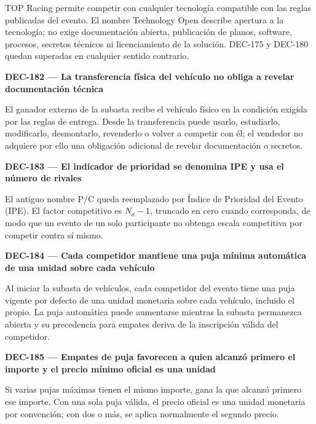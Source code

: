 \documentclass[10pt,letterpaper]{article}
\begin{document}
TOP Racing permite competir con cualquier tecnología compatible con las reglas publicadas del evento. El nombre Technology Open describe apertura a la tecnología; no exige documentación abierta, publicación de planos, software, procesos, secretos técnicos ni licenciamiento de la solución. DEC-175 y DEC-180 quedan superadas en cualquier sentido contrario.\par\vspace{0.45em}
\noindent\textbf{DEC-182 --- La transferencia física del vehículo no obliga a revelar documentación técnica}\par
El ganador externo de la subasta recibe el vehículo físico en la condición exigida por las reglas de entrega. Desde la transferencia puede usarlo, estudiarlo, modificarlo, desmontarlo, revenderlo o volver a competir con él; el vendedor no adquiere por ello una obligación adicional de revelar documentación o secretos.\par\vspace{0.45em}
\noindent\textbf{DEC-183 --- El indicador de prioridad se denomina IPE y usa el número de rivales}\par
El antiguo nombre P/C queda reemplazado por Índice de Prioridad del Evento (IPE). El factor competitivo es $N_a-1$, truncado en cero cuando corresponda, de modo que un evento de un solo participante no obtenga escala competitiva por competir contra sí mismo.\par\vspace{0.45em}
\noindent\textbf{DEC-184 --- Cada competidor mantiene una puja mínima automática de una unidad sobre cada vehículo}\par
Al iniciar la subasta de vehículos, cada competidor del evento tiene una puja vigente por defecto de una unidad monetaria sobre cada vehículo, incluido el propio. La puja automática puede aumentarse mientras la subasta permanezca abierta y su precedencia para empates deriva de la inscripción válida del competidor.\par\vspace{0.45em}
\noindent\textbf{DEC-185 --- Empates de puja favorecen a quien alcanzó primero el importe y el precio mínimo oficial es una unidad}\par
Si varias pujas máximas tienen el mismo importe, gana la que alcanzó primero ese importe. Con una sola puja válida, el precio oficial es una unidad monetaria por convención; con dos o más, se aplica normalmente el segundo precio.\par\vspace{0.45em}
\end{document}
